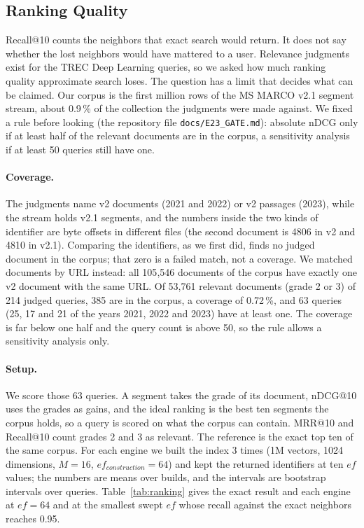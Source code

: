\documentclass[preprint,12pt]{elsarticle}
\begin{document}
\subsection{Ranking Quality}
\label{sec:ranking}

Recall@10 counts the neighbors that exact search would return. It does not say whether the lost neighbors would have
mattered to a user. Relevance judgments exist for the TREC Deep Learning queries, so we asked how much ranking quality
approximate search loses. The question has a limit that decides what can be claimed. Our corpus is the first million
rows of the MS MARCO v2.1 segment stream, about 0.9\,\% of the collection the judgments were made against. We fixed a
rule before looking (the repository file \texttt{docs/E23\_GATE.md}): absolute nDCG only if at least half of the
relevant documents are in the corpus, a sensitivity analysis if at least 50 queries still have one.

\paragraph{Coverage.} The judgments name v2 documents (2021 and 2022) or v2 passages (2023), while the stream
holds v2.1 segments, and the numbers inside the two kinds of identifier are byte offsets in different files (the second
document is 4806 in v2 and 4810 in v2.1). Comparing the identifiers, as we first did, finds no judged document
in the corpus; that zero is a failed match, not a coverage. We matched documents by URL instead: all 105{,}546 documents of the corpus
have exactly one v2 document with the same URL. Of 53{,}761 relevant documents (grade 2 or 3) of 214 judged queries, 385 are in
the corpus, a coverage of 0.72\,\%, and 63 queries (25, 17 and 21 of the years 2021, 2022 and 2023) have at least one. The
coverage is far below one half and the query count is above 50, so the rule allows a sensitivity analysis only.

\paragraph{Setup.} We score those 63 queries. A segment takes the grade of its document, nDCG@10 uses the grades
as gains, and the ideal ranking is the best ten segments the corpus holds, so a query is scored on what the corpus can
contain. MRR@10 and Recall@10 count grades 2 and 3 as relevant. The reference is the exact top ten of the same corpus.
For each engine we built the index 3 times (1M vectors, 1024 dimensions, $M=16$, $ef_{construction}=64$) and kept the
returned identifiers at ten $ef$ values; the numbers are means over builds, and the intervals are bootstrap intervals over
queries. Table~\ref{tab:ranking} gives the exact result and each engine at $ef=64$ and at the smallest swept $ef$ whose
recall against the exact neighbors reaches 0.95.
\end{document}
